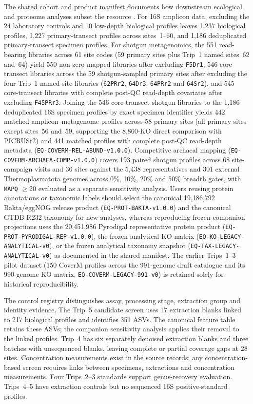 \begin{revision}
The shared cohort and product manifest documents how downstream ecological
and proteome analyses subset the resource \cite{ecology_companion,proteome_companion}.
For 16S amplicon data, excluding the 24 laboratory controls and 10
low-depth biological profiles leaves 1,237 biological profiles, 1,227
primary-transect profiles across sites~1--60, and 1,186 deduplicated
primary-transect specimen profiles. For shotgun metagenomics, the 551
read-bearing libraries across 61 site codes (59 primary sites plus
Trip~1 named sites~62 and~64) yield 550 non-zero mapped libraries after
excluding \texttt{F5Dr1}, 546 core-transect libraries across the 59
shotgun-sampled primary sites after excluding the four Trip~1 named-site
libraries (\texttt{62PRr2}, \texttt{64Dr3}, \texttt{64PRr2} and
\texttt{64Sr2}), and 545 core-transect libraries with complete post-QC
read-depth covariates after excluding \texttt{F45PRr3}. Joining the 546
core-transect shotgun libraries to the 1,186 deduplicated 16S specimen
profiles by exact specimen identifier yields 442 matched
amplicon--metagenome profiles across 58 primary sites (all primary sites
except sites~56 and~59, supporting the 8,860-KO direct comparison with
PICRUSt2) and 441 matched profiles with complete post-QC read-depth
metadata (\texttt{EQ-COVERM-REL-ABUND-v1.0.0}). Competitive archaeal
mapping (\texttt{EQ-COVERM-ARCHAEA-COMP-v1.0.0}) covers 193 paired
shotgun profiles across 68 site-campaign visits and 36 sites against the
5,438 representatives and 301 external Thermoplasmatota genomes across
0\%, 10\%, 20\% and 50\% breadth gates, with \texttt{MAPQ} $\ge 20$
evaluated as a separate sensitivity analysis. Users reusing protein
annotations or taxonomic labels should select the canonical 19,186,792
Bakta/eggNOG release product (\texttt{EQ-PROT-BAKTA-v1.0.0}) and the
canonical GTDB R232 taxonomy for new analyses, whereas reproducing
frozen companion projections uses the 20,451,986 Pyrodigal representative
protein product (\texttt{EQ-PROT-PYRODIGAL-REP-v1.0.0}), the frozen
analytical KO matrix (\texttt{EQ-KO-LEGACY-ANALYTICAL-v0}), or the frozen
analytical taxonomy snapshot (\texttt{EQ-TAX-LEGACY-ANALYTICAL-v0}) as
documented in the shared manifest. The earlier Trips~1--3 pilot dataset (150 CoverM profiles across
the 991-genome draft catalogue and its 990-genome KO matrix,
\texttt{EQ-COVERM-LEGACY-991-v0}) is retained solely for historical
reproducibility.

The control registry distinguishes assay, processing stage,
extraction group and identity evidence. The Trip~5 candidate screen
uses 17 extraction blanks linked to 217 biological profiles and
identifies 351 ASVs. The canonical feature table retains these ASVs;
the companion sensitivity analysis applies their removal to the linked
profiles. Trip~4 has six separately denoised extraction blanks and
three batches with unsequenced blanks, leaving complete or partial
coverage gaps at 28 sites. Concentration measurements exist in the
source records; any concentration-based screen requires
links between specimens, extractions and concentration measurements. Four Trips~2--3 standards
support genus-recovery evaluation. Trips~4--5 have extraction controls
but no sequenced 16S positive-standard profiles.


\end{revision}
